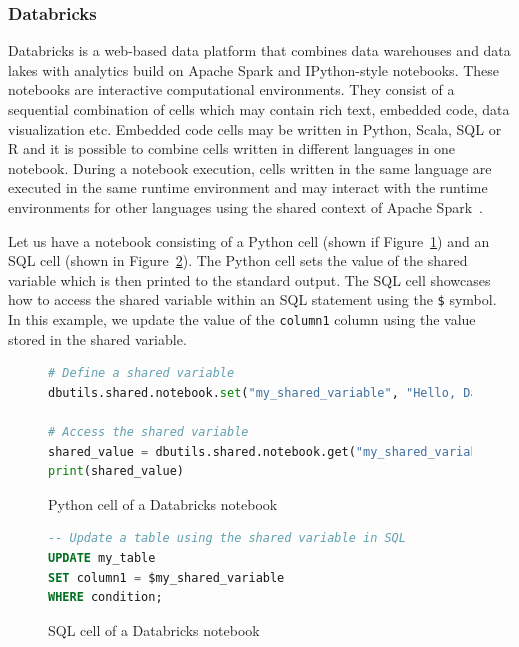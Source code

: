\subsubsection{Databricks}
Databricks is a web-based data platform that combines data warehouses and data lakes with analytics build on Apache Spark and IPython-style notebooks. These notebooks are interactive computational environments. They consist of a sequential combination of cells which may contain rich text, embedded code, data visualization etc. Embedded code cells may be written in Python, Scala, SQL or R and it is possible to combine cells written in different languages in one notebook. During a notebook execution, cells written in the same language are executed in the same runtime environment and may interact with the runtime environments for other languages using the shared context of Apache Spark~\cite{databricks}.
\par
Let us have a notebook consisting of a Python cell (shown if Figure~\ref{fig:pythonDatabricks}) and an SQL cell (shown in Figure~\ref{fig:sqlDatabricks}). The Python cell sets the value of the shared variable which is then printed to the standard output. The SQL cell showcases how to access the shared variable within an SQL statement using the \texttt{\$} symbol. In this example, we update the value of the \texttt{column1} column using the value stored in the shared variable.

\begin{figure}[ht]
\begin{lstlisting}[language=Python]
# Define a shared variable
dbutils.shared.notebook.set("my_shared_variable", "Hello, Databricks!")

# Access the shared variable
shared_value = dbutils.shared.notebook.get("my_shared_variable")
print(shared_value)
\end{lstlisting}
\caption{Python cell of a Databricks notebook}
\label{fig:pythonDatabricks}
\end{figure}

\begin{figure}[ht]
\begin{lstlisting}[language=SQL]
-- Update a table using the shared variable in SQL
UPDATE my_table
SET column1 = $my_shared_variable
WHERE condition;
\end{lstlisting}
\caption{SQL cell of a Databricks notebook}
\label{fig:sqlDatabricks}
\end{figure}

